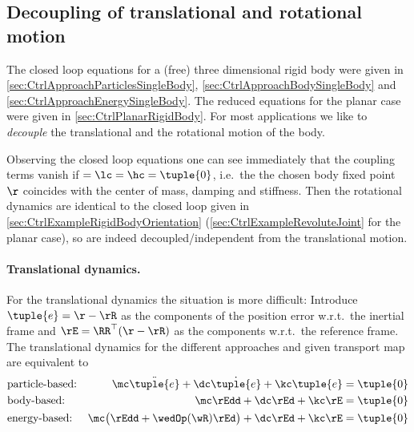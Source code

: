 \subsection{Decoupling of translational and rotational motion}\label{sec:DecouplingRigidBody}
The closed loop equations for a (free) three dimensional rigid body were given in \autoref{sec:CtrlApproachParticlesSingleBody}, \autoref{sec:CtrlApproachBodySingleBody} and \autoref{sec:CtrlApproachEnergySingleBody}.
The reduced equations for the planar case were given in \autoref{sec:CtrlPlanarRigidBody}.
For most applications we like to \textit{decouple} the translational and the rotational motion of the body.

Observing the closed loop equations one can see immediately that the coupling terms vanish if $\sc=\lc=\hc=\tuple{0}$, i.e.\ the the chosen body fixed point $\r$ coincides with the center of mass, damping and stiffness.
Then the rotational dynamics are identical to the closed loop given in \autoref{sec:CtrlExampleRigidBodyOrientation} (\autoref{sec:CtrlExampleRevoluteJoint} for the planar case), so are indeed decoupled/independent from the translational motion.

\paragraph{Translational dynamics.}
For the translational dynamics the situation is more difficult:
Introduce $\tuple{e} = \r-\rR$ as the components of the position error w.r.t.\ the inertial frame and $\rE = \RR^\top(\r-\rR)$ as the components w.r.t.\ the reference frame.
The translational dynamics for the different approaches and given transport map are equivalent to
\begin{subequations}\label{eq:RigidBodyPosErrorDyn}
\begin{align}
 &\text{particle-based:}&
 \mc\ddot{\tuple{e}} + \dc\dot{\tuple{e}} + \kc\tuple{e} &= \tuple{0}
\\
 &\text{body-based:}&
 \mc\rEdd + \dc\rEd + \kc\rE &= \tuple{0}
\\
 &\text{energy-based:}&
 \mc \big(\rEdd + \wedOp(\wR) \rEd \big) + \dc\rEd + \kc\rE &= \tuple{0}
 \label{eq:RigidBodyPosErrorDynApproach1}
\end{align}
\end{subequations}

